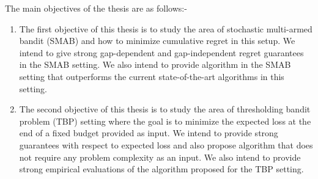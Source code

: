 The main objectives of the thesis are as follows:-
\begin{enumerate}
\item The first objective of this thesis is to study the area of stochastic multi-armed bandit (SMAB) and how to minimize cumulative regret in this setup. We intend to give strong gap-dependent and gap-independent regret guarantees in the SMAB setting. We also intend to provide algorithm in the SMAB setting that outperforms the current state-of-the-art algorithms in this setting.

\item The second objective of this thesis is to study the area of thresholding bandit problem (TBP) setting where the goal is to minimize the expected loss at the end of a fixed budget provided as input. We intend to provide strong guarantees with respect to expected loss and also propose algorithm that does not require any problem complexity as an input. We also intend to provide strong empirical evaluations of the algorithm proposed for the TBP setting.

\end{enumerate}